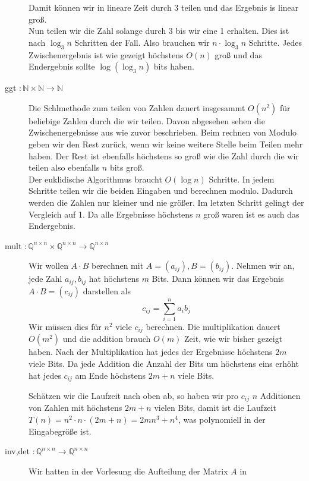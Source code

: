 \documentclass[11pt,a4paper,ngerman]{article}
\begin{document}
\begin{description}
        Damit können wir in lineare Zeit durch 3 teilen und das Ergebnis is linear groß.\\
        Nun teilen wir die Zahl solange durch 3 bis wir eine 1 erhalten. Dies ist nach $\log_3 n$ Schritten der Fall.
        Also brauchen wir $n \cdot \log_3 n$ Schritte. Jedes Zwischenergebnis ist wie gezeigt höchstens $O(n)$ groß und
        das Endergebnis sollte $\log (\log_3 n)$ bits haben.
    \item[ggt $: \mathbb{N} \times \mathbb{N} \rightarrow \mathbb{N}$]
        Die Schlmethode zum teilen von Zahlen dauert insgesammt $O(n^2)$ für beliebige Zahlen durch die wir teilen. Davon abgesehen
        sehen die Zwischenergebnisse aus wie zuvor beschrieben. Beim rechnen von Modulo geben wir den Rest zurück, wenn wir
        keine weitere Stelle beim Teilen mehr haben. Der Rest ist ebenfalls höchstens so groß wie die Zahl durch die wir teilen
        also ebenfalls $n$ bits groß.\\

        Der euklidische Algorithmus braucht $O(\log n)$ Schritte. In jedem Schritte teilen wir die beiden Eingaben und berechnen
        modulo. Dadurch werden die Zahlen nur kleiner und nie größer. Im letzten Schritt gelingt der Vergleich auf 1. Da alle
        Ergebnisse höchstens $n$ groß waren ist es auch das Endergebnis.
    \item[mult $: \mathbb{Q}^{n \times n} \times \mathbb{Q}^{n\times n} \rightarrow \mathbb{Q}^{n \times n}$]
        Wir wollen $A \cdot B$ berechnen mit $A = (a_{ij}), B = (b_{ij})$. Nehmen wir an, jede Zahl $a_{ij}, b_{ij}$ hat höchstens
        $m$ Bits.
        Dann können wir das Ergebnis 
        $A\cdot B = (c_{ij})$ darstellen als
        \begin{equation*}
            c_{ij} = \overset{n}{\underset{i=1}{\sum}} a_i b_j
        \end{equation*}
        Wir müssen dies für $n^2$ viele $c_{ij}$ berechnen. Die multiplikation dauert $O(m^2)$ und die addition brauch $O(m)$ Zeit, wie
        wir bisher gezeigt haben. Nach der Multiplikation hat jedes der Ergebnisse höchstens $2m$ viele Bits. Da jede
        Addition die Anzahl der Bits um höchstens eins erhöht hat jedes $c_{ij}$ am Ende höchstens $2m + n$ viele Bits.
        
        Schätzen wir die Laufzeit nach oben ab, so haben wir pro $c_{ij}$ $n$ Additionen von Zahlen mit höchstens $2m+n$ vielen
        Bits, damit ist die Laufzeit $T(n) = n^2 \cdot n\cdot (2m+n) = 2mn^3 + n^4$,
        was polynomiell in der Eingabegröße ist.\\
    \item[inv,det $: \mathbb{Q}^{n \times n} \rightarrow \mathbb{Q}^{n \times n}$]
        Wir hatten in der Vorlesung die Aufteilung der Matrix $A$ in



\end{description}
\end{document}
